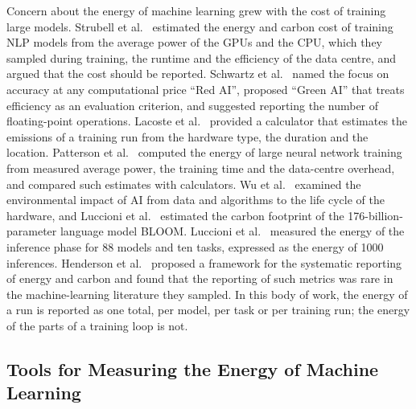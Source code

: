 Concern about the energy of machine learning grew with the cost of training large models.
Strubell et al.~\cite{strubell2019energy} estimated the energy and carbon cost of training NLP models from the average power of the GPUs and the CPU, which they sampled during training, the runtime and the efficiency of the data centre, and argued that the cost should be reported.
Schwartz et al.~\cite{schwartz2020green} named the focus on accuracy at any computational price \enquote{Red AI}, proposed \enquote{Green AI} that treats efficiency as an evaluation criterion, and suggested reporting the number of floating-point operations.
Lacoste et al.~\cite{lacoste2019quantifying} provided a calculator that estimates the emissions of a training run from the hardware type, the duration and the location.
Patterson et al.~\cite{patterson2021carbon} computed the energy of large neural network training from measured average power, the training time and the data-centre overhead, and compared such estimates with calculators.
Wu et al.~\cite{wu2022sustainable} examined the environmental impact of AI from data and algorithms to the life cycle of the hardware, and Luccioni et al.~\cite{luccioni2023bloom} estimated the carbon footprint of the 176-billion-parameter language model BLOOM.
Luccioni et al.~\cite{luccioni2024power} measured the energy of the inference phase for 88 models and ten tasks, expressed as the energy of \num{1000} inferences.
Henderson et al.~\cite{henderson2020systematic} proposed a framework for the systematic reporting of energy and carbon and found that the reporting of such metrics was rare in the machine-learning literature they sampled.
In this body of work, the energy of a run is reported as one total, per model, per task or per training run; the energy of the parts of a training loop is not.

\subsection{Tools for Measuring the Energy of Machine Learning}\label{sec:related-tools}

